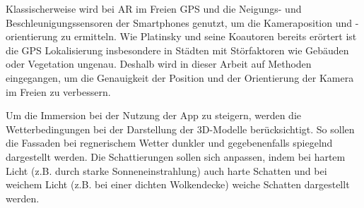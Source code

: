 Klassischerweise wird bei AR im Freien GPS und die Neigungs- und Beschleunigungssensoren der Smartphones genutzt, um die Kameraposition und -orientierung zu ermitteln. Wie Platinsky und seine Koautoren\cite{platinsky} bereits erörtert ist die GPS Lokalisierung insbesondere in Städten mit Störfaktoren wie Gebäuden oder Vegetation ungenau. Deshalb wird in dieser Arbeit auf Methoden eingegangen, um die Genauigkeit der Position und der Orientierung der Kamera im Freien zu verbessern.

Um die Immersion bei der Nutzung der App zu steigern, werden die Wetterbedingungen bei der Darstellung der 3D-Modelle berücksichtigt. So sollen die Fassaden bei regnerischem Wetter dunkler und gegebenenfalls spiegelnd dargestellt werden. Die Schattierungen sollen sich anpassen, indem bei hartem Licht (z.B. durch starke Sonneneinstrahlung) auch harte Schatten und bei weichem Licht (z.B. bei einer dichten Wolkendecke) weiche Schatten dargestellt werden.